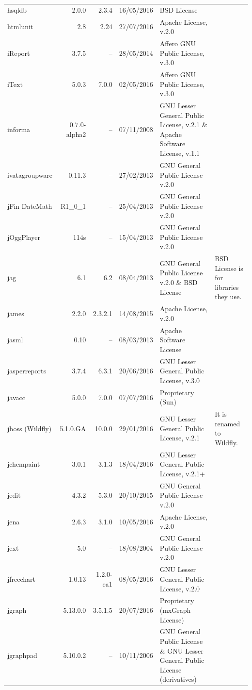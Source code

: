 \documentclass{IEEEtran}
\begin{document}
\begin{table}[H]
\begin{tabular}{l|r|r|c|p{5cm}|p{3cm}}
	hsqldb & 2.0.0 & 2.3.4 & 16/05/2016 & BSD License & \\
	htmlunit & 2.8 & 2.24 & 27/07/2016 & Apache License, v.2.0 & \\
	iReport & 3.7.5 & -- & 28/05/2014 & Affero GNU Public License, v.3.0 & \\
	iText & 5.0.3 & 7.0.0 & 02/05/2016 & Affero GNU Public License, v.3.0 & \\
	informa & 0.7.0-alpha2 & -- & 07/11/2008 & GNU Lesser General Public License, v.2.1 \& Apache Software License, v.1.1 & \\
	ivatagroupware & 0.11.3 & -- & 27/02/2013  & GNU General Public License v.2.0 & \\
	jFin DateMath & R1\_0\_1 & -- & 25/04/2013  & GNU General Public License v.2.0 & \\
	jOggPlayer & 114s & -- &  15/04/2013   & GNU General Public License v.2.0 & \\
	jag & 6.1 & 6.2 & 08/04/2013   & GNU General Public License v.2.0 \& BSD License & BSD License is for libraries they use. \\
	james & 2.2.0 & 2.3.2.1 & 14/08/2015 & Apache License, v.2.0 & \\
	jasml & 0.10 & -- & 08/03/2013 & Apache Software License & \\
	jasperreports & 3.7.4 & 6.3.1 & 20/06/2016 & GNU Lesser General Public License, v.3.0 &  \\
	javacc & 5.0.0 & 7.0.0 & 07/07/2016 & Proprietary (Sun) & \\
	jboss (Wildfly) & 5.1.0.GA & 10.0.0 & 29/01/2016 & GNU Lesser General Public License, v.2.1 & It is renamed to Wildfly. \\
	jchempaint & 3.0.1 & 3.1.3 & 18/04/2016 & GNU Lesser General Public License, v.2.1+ &  \\
	jedit & 4.3.2 & 5.3.0 & 20/10/2015  & GNU General Public License v.2.0 &  \\
	jena & 2.6.3 & 3.1.0 & 10/05/2016 & Apache License, v.2.0 & \\
	jext & 5.0 & -- & 18/08/2004   & GNU General Public License v.2.0 &  \\
	jfreechart & 1.0.13 & 1.2.0-ea1 & 08/05/2016  & GNU Lesser General Public License, v.2.0 &   \\
	jgraph & 5.13.0.0 & 3.5.1.5 & 20/07/2016 & Proprietary (mxGraph License) & \\
	jgraphpad & 5.10.0.2 & -- & 10/11/2006 & GNU General Public License  \& GNU Lesser General Public License (derivatives) & \\

\end{tabular}
\end{table}
\end{document}
